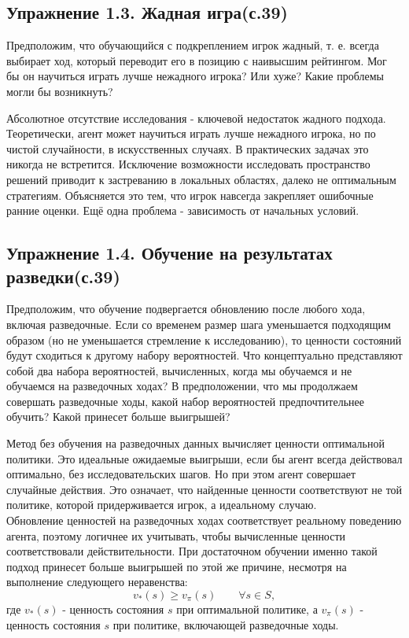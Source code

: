 \subsection{Упражнение 1.3. Жадная игра(с.39)}
Предположим, что обучающийся с подкреплением игрок жадный, т. е. всегда выбирает ход, который переводит его в позицию с наивысшим рейтингом. Мог бы он научиться играть лучше нежадного игрока? Или хуже? Какие проблемы могли бы возникнуть?
\begin{solution}
    Абсолютное отсутствие исследования - ключевой недостаток жадного подхода. Теоретически, агент может научиться играть лучше нежадного игрока, но по чистой случайности, в искусственных случаях. В практических задачах это никогда не встретится. Исключение возможности исследовать пространство решений приводит к застреванию в локальных областях, далеко не оптимальным стратегиям. Объясняется это тем, что игрок навсегда закрепляет ошибочные ранние оценки. Ещё одна проблема - зависимость от начальных условий.
\end{solution}

\subsection{Упражнение 1.4. Обучение на результатах разведки(с.39)}
Предположим, что обучение подвергается обновлению после любого хода, включая разведочные. Если со временем размер шага уменьшается подходящим образом (но не уменьшается стремление к исследованию), то ценности состояний будут сходиться к другому набору вероятностей. Что концептуально представляют собой два набора вероятностей, вычисленных, когда мы обучаемся и не обучаемся на разведочных ходах? В предположении, что мы продолжаем совершать разведочные ходы, какой набор вероятностей предпочтительнее обучить? Какой принесет больше выигрышей?
\begin{solution}
    Метод без обучения на разведочных данных вычисляет ценности оптимальной политики. Это идеальные ожидаемые выигрыши, если бы агент всегда действовал оптимально, без исследовательских шагов. Но при этом агент совершает случайные действия. Это означает, что найденные ценности соответствуют не той политике, которой придерживается игрок, а идеальному случаю. \\
    Обновление ценностей на разведочных ходах соответствует реальному поведению агента, поэтому логичнее их учитывать, чтобы вычисленные ценности соответствовали действительности. При достаточном обучении именно такой подход принесет больше выигрышей по этой же причине, несмотря на выполнение следующего неравенства:
    \[v_*(s) \ge v_\pi(s) \qquad \forall s \in S,\]
    где $v_*(s)$ - ценность состояния $s$ при оптимальной политике, а $v_\pi(s)$ - ценность состояния $s$ при политике, включающей разведочные ходы.
\end{solution}

